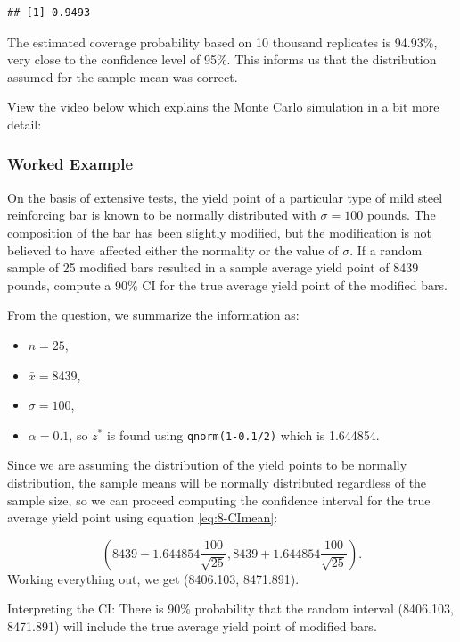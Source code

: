 \documentclass[
]{book}
\providecommand{\tightlist}{%
  \setlength{\itemsep}{0pt}\setlength{\parskip}{0pt}}
\begin{document}
\begin{verbatim}
## [1] 0.9493
\end{verbatim}

The estimated coverage probability based on 10 thousand replicates is 94.93\%, very close to the confidence level of 95\%. This informs us that the distribution assumed for the sample mean was correct.

View the video below which explains the Monte Carlo simulation in a bit more detail:

\hypertarget{worked-example-1}{%
\subsubsection{Worked Example}\label{worked-example-1}}

On the basis of extensive tests, the yield point of a particular type of mild steel reinforcing bar is known to be normally distributed with \(\sigma=100\) pounds. The composition of the bar has been slightly modified, but the modification is not believed to have affected either the normality or the value of \(\sigma\). If a random sample of 25 modified bars resulted in a sample average yield point of 8439 pounds, compute a 90\% CI for the true average yield point of the modified bars.

From the question, we summarize the information as:

\begin{itemize}
\tightlist
\item
  \(n = 25\),
\item
  \(\bar{x} = 8439\),
\item
  \(\sigma = 100\),
\item
  \(\alpha = 0.1\), so \(z^*\) is found using \texttt{qnorm(1-0.1/2)} which is 1.644854.
\end{itemize}

Since we are assuming the distribution of the yield points to be normally distribution, the sample means will be normally distributed regardless of the sample size, so we can proceed computing the confidence interval for the true average yield point using equation \eqref{eq:8-CImean}:

\[
\left( 8439 - 1.644854 \frac{100}{\sqrt{25}} , 8439 + 1.644854 \frac{100}{\sqrt{25}} \right).
\]
Working everything out, we get (8406.103, 8471.891).

Interpreting the CI: There is 90\% probability that the random interval (8406.103, 8471.891) will include the true average yield point of modified bars.
\end{document}
